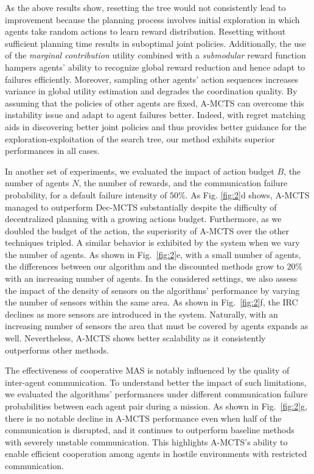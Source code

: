 As the above results show, resetting the tree would not consistently lead to improvement because the planning process involves initial exploration in which agents take random actions to learn reward distribution. Resetting without sufficient planning time results in suboptimal joint policies. Additionally, the use of the \emph{marginal contribution} utility combined with a \emph{submodular} reward function hampers agents' ability to recognize global reward reduction and hence adapt to failures efficiently. Moreover, sampling other agents' action sequences increases variance in global utility estimation and degrades the coordination quality. By assuming that the policies of other agents are fixed, A-MCTS can overcome this instability issue and adapt to agent failures better. Indeed, with regret matching aids in discovering better joint policies and thus provides better guidance for the exploration-exploitation of the search tree, our method exhibits superior performances in all cases.

In another set of experiments, we evaluated the impact of action budget $B$, the number of agents $N$, the number of rewards, and the communication failure probability, for a default failure intensity of $50\%$. As Fig. \ref{fig:2}d shows, A-MCTS managed to outperform Dec-MCTS substantially despite the difficulty of decentralized planning with a growing actions budget. Furthermore, as we doubled the budget of the action, the superiority of A-MCTS over the other techniques tripled. A similar behavior is exhibited by the system when we vary the number of agents. As shown in Fig.~\ref{fig:2}e, with a small number of agents, the differences between our algorithm and the discounted methods grow to $20\%$ with an increasing number of agents. In the considered settings, we also assess the impact of the density of sensors on the algorithms' performance by varying the number of sensors within the same area. As shown in Fig.~\ref{fig:2}f, the IRC declines as more sensors are introduced in the system. Naturally, with an increasing number of sensors the area that must be covered by agents expands as well. Nevertheless, A-MCTS shows better scalability as it consistently outperforms other methods.

The effectiveness of cooperative MAS is notably influenced by the quality of inter-agent communication. To understand better the impact of such limitations, we evaluated the algorithms' performances under different communication failure probabilities between each agent pair during a mission. As shown in Fig.~\ref{fig:2}g, there is no notable decline in A-MCTS performance even when half of the communication is disrupted, and it continues to outperform baseline methods with severely unstable communication. This highlights A-MCTS's ability to enable efficient cooperation among agents in hostile environments with restricted communication.

